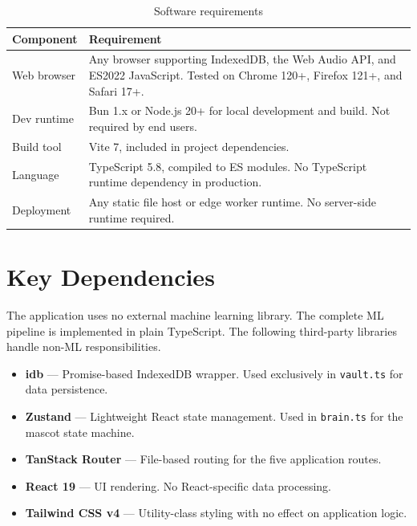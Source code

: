 \documentclass[11pt, a4paper]{report}
\begin{document}
\begin{table}[H]
\centering
\caption{Software requirements}
\label{tab:software}
\begin{tabularx}{\textwidth}{@{} p{2.8cm} X @{}}
\toprule
\textbf{Component} & \textbf{Requirement} \\
\midrule
Web browser
  & Any browser supporting IndexedDB, the Web Audio API, and
    ES2022 JavaScript. Tested on Chrome 120+, Firefox 121+,
    and Safari 17+. \\[5pt]
Dev runtime
  & Bun 1.x or Node.js 20+ for local development and build.
    Not required by end users. \\[5pt]
Build tool
  & Vite 7, included in project dependencies. \\[5pt]
Language
  & TypeScript 5.8, compiled to ES modules. No TypeScript
    runtime dependency in production. \\[5pt]
Deployment
  & Any static file host or edge worker runtime. No
    server-side runtime required. \\
\bottomrule
\end{tabularx}
\end{table}

\section{Key Dependencies}

The application uses no external machine learning library. The complete ML
pipeline is implemented in plain TypeScript. The following third-party
libraries handle non-ML responsibilities.

\begin{itemize}
  \item \textbf{idb} --- Promise-based IndexedDB wrapper. Used exclusively
    in \texttt{vault.ts} for data persistence.
  \item \textbf{Zustand} --- Lightweight React state management. Used in
    \texttt{brain.ts} for the mascot state machine.
  \item \textbf{TanStack Router} --- File-based routing for the five
    application routes.
  \item \textbf{React 19} --- UI rendering. No React-specific data
    processing.
  \item \textbf{Tailwind CSS v4} --- Utility-class styling with no
    effect on application logic.
\end{itemize}

\end{document}
